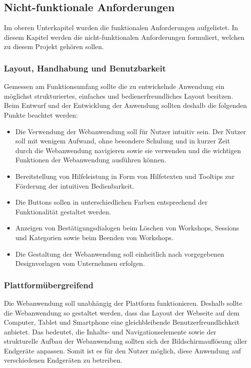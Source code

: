 \subsection{Nicht-funktionale Anforderungen}
\label{sec:nicht-funktionale anforderungen}
Im oberen Unterkapitel wurden die funktionalen Anforderungen aufgelistet. In diesem Kapitel werden die nicht-funktionalen Anforderungen formuliert, welchen zu diesem Projekt gehören sollen.

\subsubsection*{Layout, Handhabung und Benutzbarkeit}
Gemessen am Funktionsumfang sollte die zu entwickelnde Anwendung ein möglichst strukturiertes, einfaches und bedienerfreundliches Layout besitzen. Beim Entwurf und der Entwicklung der Anwendung sollten deshalb die folgenden Punkte beachtet werden:
\begin{itemize}
\item Die Verwendung der Webanwendung soll für Nutzer intuitiv sein. Der Nutzer soll mit wenigem Aufwand, ohne besondere Schulung und in kurzer Zeit durch die Webanwendung navigieren sowie sie verwenden und die wichtigen Funktionen der Webanwendung ausführen können.
\item Bereitstellung von Hilfeleistung in Form von Hilfetexten und Tooltips zur Förderung der intuitiven Bedienbarkeit.
\item Die Buttons sollen in unterschiedlichen Farben entsprechend der Funktionalität gestaltet werden.
\item Anzeigen von Bestätigungsdialogen beim Löschen von Workshops, Sessions und Kategorien sowie beim Beenden von Workshops.
\item Die Gestaltung der Webanwendung soll einheitlich nach vorgegebenen Designvorlagen vom Unternehmen erfolgen.
\end{itemize}

\subsubsection*{Plattformübergreifend}
Die Webanwendung soll unabhängig der Plattform funktionieren. Deshalb sollte die Webanwendung so gestaltet werden, dass das Layout der Webseite auf dem Computer, Tablet und Smartphone eine gleichbleibende Benutzerfreundlichkeit anbietet. Das bedeutet, die Inhalts- und Navigationselemente sowie der strukturelle Aufbau der Webanwendung sollten sich der Bildschirmauflösung aller Endgeräte anpassen. Somit ist es für den Nutzer möglich, diese Anwendung auf verschiedenen Endgeräten zu betreiben.

